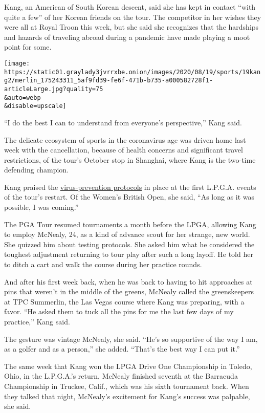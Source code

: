 Kang, an American of South Korean descent, said she has kept in contact
``with quite a few'' of her Korean friends on the tour. The competitor
in her wishes they were all at Royal Troon this week, but she said she
recognizes that the hardships and hazards of traveling abroad during a
pandemic have made playing a moot point for some.

\texttt{[image: https://static01.graylady3jvrrxbe.onion/images/2020/08/19/sports/19kang2/merlin\_175243311\_5af9fd39-fe6f-471b-b735-a000582728f1-articleLarge.jpg?quality=75\\\&auto=webp\\\&disable=upscale]}

``I do the best I can to understand from everyone's perspective,'' Kang
said.

The delicate ecosystem of sports in the coronavirus age was driven home
last week with the cancellation, because of health concerns and
significant travel restrictions, of the tour's October stop in Shanghai,
where Kang is the two-time defending champion.

Kang praised the
\href{https://www.nytimes3xbfgragh.onion/2020/05/14/sports/golf/pga-lpga-tour-caddies-coronavirus.html}{virus-prevention
protocols} in place at the first L.P.G.A. events of the tour's restart.
Of the Women's British Open, she said, ``As long as it was possible, I
was coming.''

The PGA Tour resumed tournaments a month before the LPGA, allowing Kang
to employ McNealy, 24, as a kind of advance scout for her strange, new
world. She quizzed him about testing protocols. She asked him what he
considered the toughest adjustment returning to tour play after such a
long layoff. He told her to ditch a cart and walk the course during her
practice rounds.

And after his first week back, when he was back to having to hit
approaches at pins that weren't in the middle of the greens, McNealy
called the greenskeepers at TPC Summerlin, the Las Vegas course where
Kang was preparing, with a favor. ``He asked them to tuck all the pins
for me the last few days of my practice,'' Kang said.

The gesture was vintage McNealy, she said. ``He's so supportive of the
way I am, as a golfer and as a person,'' she added. ``That's the best
way I can put it.''

The same week that Kang won the LPGA Drive One Championship in Toledo,
Ohio, in the L.P.G.A.'s return, McNealy finished seventh at the
Barracuda Championship in Truckee, Calif., which was his sixth
tournament back. When they talked that night, McNealy's excitement for
Kang's success was palpable, she said.

